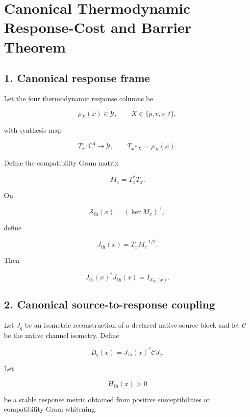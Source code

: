 \hypertarget{canonical-thermodynamic-response-cost-and-barrier-theorem}{%
\chapter{Canonical Thermodynamic Response-Cost and Barrier Theorem}\label{canonical-thermodynamic-response-cost-and-barrier-theorem}}

\hypertarget{canonical-response-frame}{%
\section{1. Canonical response frame}\label{canonical-response-frame}}

Let the four thermodynamic response columns be

\[
\rho_X(x)\in\mathcal Y,
\qquad X\in\{p,v,s,t\},
\]

with synthesis map

\[
T_x:\mathbb C^4\to\mathcal Y,
\qquad T_xe_X=\rho_X(x).
\]

Define the compatibility Gram matrix

\[
M_x=T_x^*T_x.
\]

On

\[
\mathcal S_{\mathrm{th}}(x)=(\ker M_x)^\perp,
\]

define

\[
\boxed{
J_{\mathrm{th}}(x)=T_xM_x^{-1/2}.
}
\]

Then

\[
J_{\mathrm{th}}(x)^*J_{\mathrm{th}}(x)=I_{\mathcal S_{\mathrm{th}}(x)}.
\]

\hypertarget{canonical-source-to-response-coupling}{%
\section{2. Canonical source-to-response coupling}\label{canonical-source-to-response-coupling}}

Let \(J_q\) be an isometric reconstruction of a declared native source block and let \(\mathcal C\) be the native channel isometry. Define

\[
\boxed{
B_q(x)=J_{\mathrm{th}}(x)^*\mathcal C J_q.
}
\]

Let

\[
H_{\mathrm{th}}(x)>0
\]

be a stable response metric obtained from positive susceptibilities or compatibility-Gram whitening.

